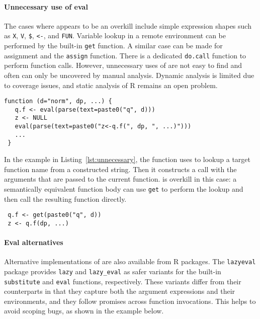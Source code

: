 \documentclass[acmsmall, screen]{acmart}
\renewcommand{\k}[1]{\lstinline |#1|\xspace}
\begin{document}
\paragraph{Unnecessary use of eval} The cases where \eval appears to be an
overkill include simple expression shapes such as \k{X}, \k{V}, \texttt{\$},
\k{<-}, and \k{FUN}. Variable lookup in a remote environment can be performed by
the built-in \k{get} function. A similar case can be made for assignment and the
\k{assign} function. There is a dedicated \k{do.call} function to perform
function calls. However, unnecessary uses of \eval are not easy to find and
often can only be uncovered by manual analysis. Dynamic analysis is limited due
to coverage issues, and static analysis of R remains an open problem.

\begin{lstlisting}[caption={Unnecessary use of \eval (\k{PerformanceAnalytics::chart.QQPlot})},label=lst:unnecessary]
function (d="norm", dp, ...) {
   q.f <- eval(parse(text=paste0("q", d)))
   z <- NULL
   eval(parse(text=paste0("z<-q.f(", dp, ", ...)")))
   ...
 }
\end{lstlisting}\medskip

In the example in Listing~\ref{lst:unnecessary}, the function uses \eval to
lookup a target function name from a constructed string. Then it constructs a
call with the arguments that are passed to the current function. \Eval is
overkill in this case: a semantically equivalent function body can use \k{get}
to perform the lookup and then call the resulting function directly.

\begin{lstlisting}
 q.f <- get(paste0("q", d))
 z <- q.f(dp, ...)
\end{lstlisting}

\paragraph{Eval alternatives}
Alternative implementations of \eval are also available from R packages. The
\k{lazyeval} package provides \k{lazy} and \k{lazy_eval} as safer variants for
the built-in \k{substitute} and \k{eval} functions, respectively. These variants
differ from their counterparts in that they capture both the argument
expressions and their environments, and they follow promises across function
invocations. This helps to avoid scoping bugs, as shown in the example below.
\end{document}
